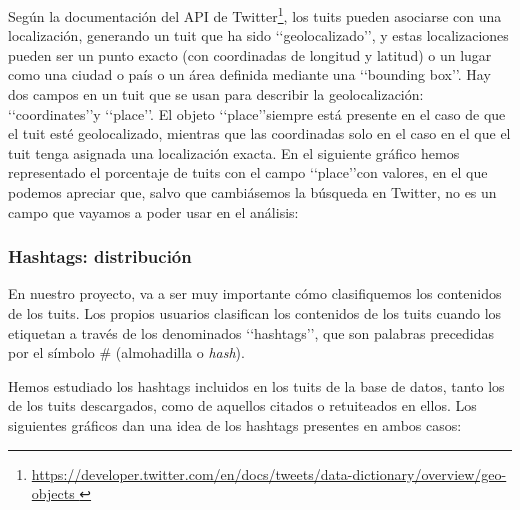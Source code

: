 Según la documentación del API de Twitter\footnote{\url{https://developer.twitter.com/en/docs/tweets/data-dictionary/overview/geo-objects }},
los tuits pueden asociarse con una localización, generando un tuit que ha sido \lq\lq geolocalizado\rq\rq, y estas localizaciones pueden ser un punto exacto (con coordinadas de longitud y latitud) o un lugar como una ciudad o país o un área definida mediante una \lq\lq bounding box\rq\rq. Hay dos campos en un tuit que se usan para describir la geolocalización: \lq\lq coordinates\rq\rq y \lq\lq place\rq\rq. El objeto \lq\lq place\rq\rq siempre está presente en el caso de que el tuit esté geolocalizado, mientras que las coordinadas solo en el caso en el que el tuit tenga asignada una localización exacta. En el siguiente gráfico hemos 
representado el porcentaje de tuits con el campo \lq\lq place\rq\rq con valores, en el que
podemos apreciar que, salvo que cambiásemos la búsqueda en Twitter, no es un campo que vayamos a poder usar en el análisis:




\subsubsection{Hashtags: distribución}
\label{sect:hashtags}
En nuestro proyecto, va a ser muy importante cómo clasifiquemos los contenidos de los tuits. 
Los propios usuarios clasifican los contenidos de los tuits cuando los etiquetan a través
de los denominados \lq\lq hashtags\rq\rq,  que son palabras precedidas por el símbolo \# 
(almohadilla o {\em hash}).

Hemos estudiado los hashtags incluidos en los tuits de la base de datos, tanto los de los tuits
descargados, como de aquellos citados o retuiteados en ellos. Los siguientes gráficos dan una idea de los hashtags presentes en ambos casos:


